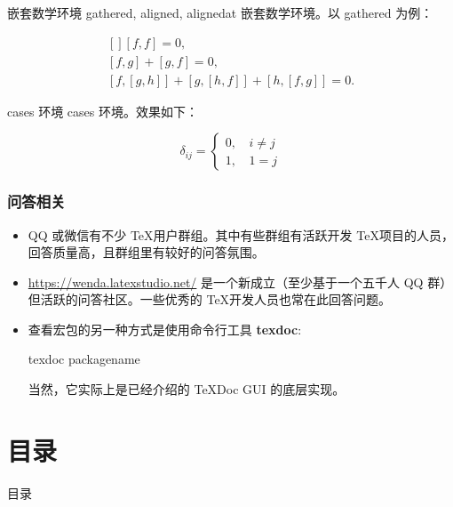 \documentclass[final,aspectratio=169]{ctexbeamer}
\begin{document}
\begin{frame}[fragile]{嵌套数学环境}
gathered, aligned, alignedat 嵌套数学环境。以 gathered 为例：
\begin{vertlst}

\begin{equation}
\begin{gathered}[]
  [f, f] = 0, \\ [f, g] + [g, f] = 0, \\
  [f, [g, h]] + [g, [h, f]] + [h, [f, g]] = 0.
\end{gathered}
\end{equation} 
\end{vertlst}
\end{frame}

\begin{frame}[fragile]{cases 环境}
cases 环境。效果如下：
\begin{sidelst}
\begin{equation}
  \delta_{ij} =
  \begin{cases}
    0, \, & i \ne j \\
    1, & 1 = j
  \end{cases}
\end{equation}
\end{sidelst}
\end{frame}

\begin{frame}[fragile]
\frametitle{问答相关}
\begin{itemize}
\item QQ 或微信有不少 \TeX 用户群组。其中有些群组有活跃开发 \TeX 项目的人员，回答质量高，且群组里有较好的问答氛围。
\item \url{https://wenda.latexstudio.net/} 是一个新成立（至少基于一个五千人 QQ 群）但活跃的问答社区。一些优秀的 \TeX 开发人员也常在此回答问题。
\item 查看宏包的另一种方式是使用命令行工具 \textbf{texdoc}:
\begin{bashlst}
texdoc packagename
\end{bashlst}
当然，它实际上是已经介绍的 TeXDoc GUI 的底层实现。
\end{itemize}
\end{frame}

\section*{目录}
\begin{frame}{目录}
\begin{columns}
  \begin{column}{.6\linewidth}
  \tableofcontents[hideallsubsections]
  \end{column}
  \begin{column}{.4\linewidth}
  \end{column}
\end{columns}
\end{frame}
\end{document}

